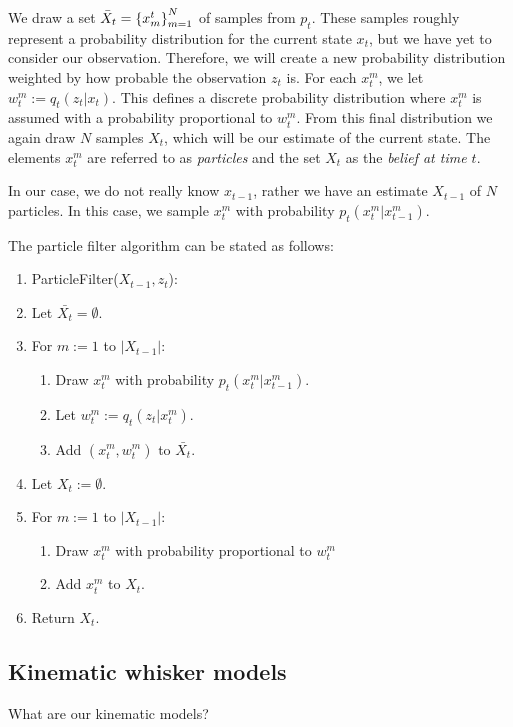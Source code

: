 We draw a set $\bar{X}_t = \left\{x_{m}^{t}\right\}_{m=1}^{N}$ of samples from $p_t$. These samples roughly represent a probability distribution for the current state $x_t$, but we have yet to consider our observation. Therefore, we will create a new probability distribution weighted by how probable the observation $z_t$ is. For each $x_t^m$, we let $w_t^m := q_t\left(z_t | x_t\right)$. This defines a discrete probability distribution where $x_t^m$ is assumed with a probability proportional to $w_t^m$. From this final distribution we again draw $N$ samples $X_t$, which will be our estimate of the current state. The elements $x_t^m$ are referred to as \emph{particles} and the set $X_t$ as the \emph{belief at time $t$}.

In our case, we do not really know $x_{t-1}$, rather we have an estimate $X_{t-1}$ of $N$ particles. In this case, we sample $x_t^m$ with probability $p_t\left(x_t^m | x_{t-1}^m\right)$.

The particle filter algorithm can be stated as follows:
\begin{enumerate}
\item ParticleFilter($X_{t-1}, z_t$):
\item Let $\bar{X_t} = \emptyset$.
\item For $m:=1$ to $\left|X_{t-1}\right|$:
  \begin{enumerate}
  \item Draw $x_t^m$ with probability $p_t\left(x_t^m | x_{t-1}^m\right)$.
  \item Let $w_t^m := q_t\left(z_t | x_t^m\right)$.
  \item Add $(x_t^m, w_t^m)$ to $\bar{X_t}$.
  \end{enumerate}
\item Let $X_t := \emptyset$.
\item For $m:=1$ to $\left|X_{t-1}\right|$:
  \begin{enumerate}
    \item Draw $x_t^m$ with probability proportional to $w_t^m$
    \item Add $x_t^m$ to $X_t$.
  \end{enumerate}
\item Return $X_t$.
\end{enumerate}

\subsection{Kinematic whisker models}
What are our kinematic models?
